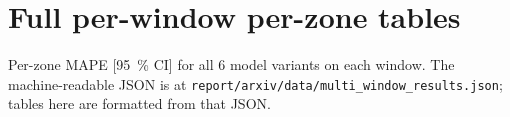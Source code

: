 
\section{Full per-window per-zone tables}
\label{app:tables}

Per-zone MAPE [95~\% CI] for all 6 model variants on each window. The
machine-readable JSON is at
\texttt{report/arxiv/data/multi\_window\_results.json}; tables here are
formatted from that JSON.

\begin{table}[h]
\centering\small
\caption{W1 = 2025-05-01 to 05-07. Per-zone MAPE [95 \% CI].}
\label{tab:full_w1}
\PHTABLEWONE{}
\end{table}

\begin{table}[h]
\centering\small
\caption{W2 = 2026-04-28 to 05-04. Per-zone MAPE [95 \% CI].}
\label{tab:full_w2}
\PHTABLEWTWO{}
\end{table}
